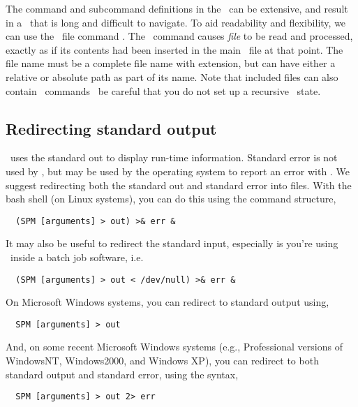 The command and subcommand definitions in the \config\ can be extensive, and result in a \config\ that is long and difficult to navigate. To aid readability and flexibility, we can use the \config\ file command . The \ command causes \emph{file} to be read and processed, exactly as if its contents had been inserted in the main \config\ file at that point. The file name must be a complete file name with extension, but can have either a relative or absolute path as part of its name. Note that included files can also contain \ commands \textemdash\ be careful that you do not set up a recursive \ state.

\subsection{Redirecting standard output\label{sec:redirecting-stdout}}

\SPM\ uses the standard out to display run-time information. Standard error is not used by \SPM, but may be used by the operating system to report an error with \SPM. We suggest redirecting both the standard out and standard error into files. With the bash shell (on Linux systems), you can do this using the command structure,

\begin{verbatim}  (SPM [arguments] > out) >& err &\end{verbatim}

It may also be useful to redirect the standard input, especially is you're using \SPM\ inside a batch job software, i.e. 

\begin{verbatim}  (SPM [arguments] > out < /dev/null) >& err &\end{verbatim}

On Microsoft Windows systems, you can redirect to standard output using,

\begin{verbatim}  SPM [arguments] > out\end{verbatim}

And, on some recent Microsoft Windows systems (e.g., Professional versions of WindowsNT, Windows2000, and Windows XP), you can redirect to both standard output and standard error, using the syntax, 

\begin{verbatim}  SPM [arguments] > out 2> err\end{verbatim}

